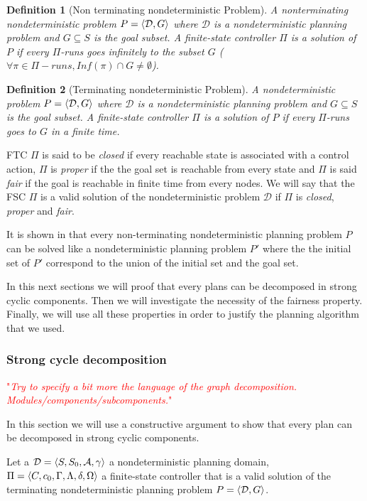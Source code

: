 \documentclass{article}
\newcommand\comment[1]{\textcolor{red}{"\textit{#1}"}}
\theoremstyle{named}
\newtheorem*{nameddefinition}{Definition}
\newcommand{\thmsymbol}{\( \blacktriangle \)}
\newenvironment{nameddef}[1]
    {\begin{samepage}
    \begin{nameddefinition}[#1]
    \renewcommand{\qedsymbol}{\thmsymbol}\pushQED{\qed}
    }
    {
    \popQED %
    \end{nameddefinition} 
    \end{samepage}
    }
\begin{document}
\begin{nameddef}{Non terminating nondeterministic Problem}
A nonterminating nondeterministic problem $P = \planningproblem$ where $\mathcal{D}$ is a nondeterministic planning problem and $G \subseteq S$ is the goal subset. A finite-state controller $\Pi$ is a solution of $P$ if every $\Pi$-runs goes infinitely to the subset $G$ ($\forall \pi \in \Pi-runs, Inf(\pi) \cap G \neq \emptyset$).
\end{nameddef}

\begin{nameddef}{Terminating nondeterministic Problem}
A nondeterministic problem $P = \planningproblem$ where $\mathcal{D}$ is a nondeterministic planning problem and $G \subseteq S$ is the goal subset. A finite-state controller $\Pi$ is a solution of $P$ if every $\Pi$-runs goes to $G$ in a finite time.
\end{nameddef}

FTC $\Pi$ is said to be \textit{closed} if every reachable state is associated with a control  action, $\Pi$ is \textit{proper} if the the goal set is reachable from every state and $\Pi$ is said \textit{fair} if the goal is reachable in finite time from every nodes.
We will say that the FSC $\Pi$ is a valid solution of the nondeterministic problem $\mathcal{D}$ if $\Pi$ is \textit{closed}, \textit{proper} and \textit{fair}.

It is shown in \cite{patrizi2013fair} that every non-terminating nondeterministic planning problem $P$ can be solved like a nondeterministic planning problem $P'$ where the the initial set of $P'$ correspond to the union of the initial set and the goal set.

In this next sections we will proof that every plans can be decomposed in strong cyclic components.
Then we will investigate the necessity of the fairness property.
Finally, we will use all these properties in order to justify the planning algorithm that we used.

\subsubsection{Strong cycle decomposition}
\comment{Try to specify a bit more the language of the graph decomposition.
Modules/components/subcomponents.}

In this section we will use a constructive argument to show that every plan can be decomposed in strong cyclic components.

Let a $\mathcal{D} = \planningdomain$ a nondeterministic planning domain, $\Pi = \controller$ a finite-state controller that is a valid solution of the terminating nondeterministic planning problem $P = \planningproblem$.
\end{document}
